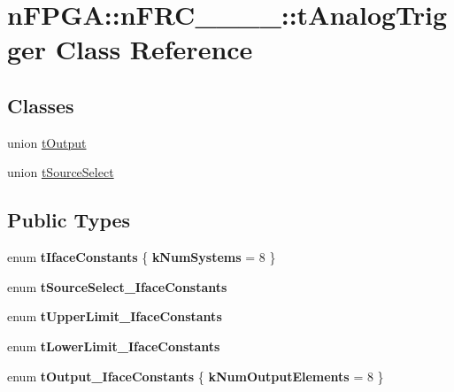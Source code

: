 \hypertarget{classnFPGA_1_1nFRC__2012__1__6__4_1_1tAnalogTrigger}{
\section{nFPGA::nFRC\_\_\_\_::tAnalogTrigger Class Reference}
\label{classnFPGA_1_1nFRC__2012__1__6__4_1_1tAnalogTrigger}
}
\subsection*{Classes}
\begin{DoxyCompactItemize}
\item 
union \hyperlink{unionnFPGA_1_1nFRC__2012__1__6__4_1_1tAnalogTrigger_1_1tOutput}{tOutput}
\item 
union \hyperlink{unionnFPGA_1_1nFRC__2012__1__6__4_1_1tAnalogTrigger_1_1tSourceSelect}{tSourceSelect}
\end{DoxyCompactItemize}
\subsection*{Public Types}
\begin{DoxyCompactItemize}
\item 
enum {\bfseries tIfaceConstants} \{ {\bfseries kNumSystems} =  8
 \}
\item 
enum {\bfseries tSourceSelect\_\-IfaceConstants} 
\item 
enum {\bfseries tUpperLimit\_\-IfaceConstants} 
\item 
enum {\bfseries tLowerLimit\_\-IfaceConstants} 
\item 
enum {\bfseries tOutput\_\-IfaceConstants} \{ {\bfseries kNumOutputElements} =  8
 \}
\end{DoxyCompactItemize}
